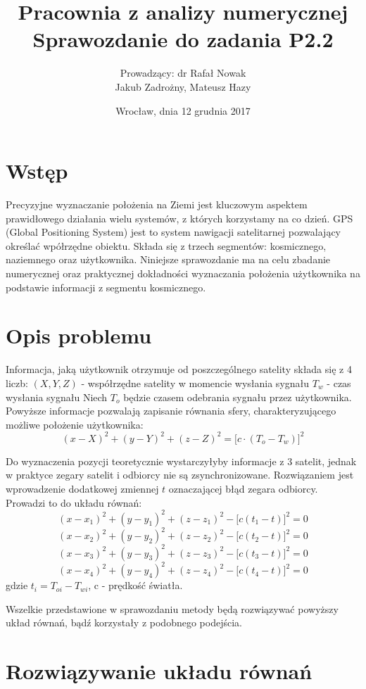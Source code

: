 \documentclass{article}
\title{\textbf{Pracownia z analizy numerycznej} \\ Sprawozdanie do zadania \textbf{P2.2}}
\author{Prowadzący: dr Rafał Nowak \\ Jakub Zadrożny, Mateusz Hazy}
\date{Wrocław, dnia 12 grudnia 2017}
\begin{document}
	\maketitle
	\section{Wstęp}
	Precyzyjne wyznaczanie położenia na Ziemi jest kluczowym aspektem prawidłowego działania wielu systemów, z których korzystamy na co dzień. GPS (Global Positioning System) jest to system nawigacji satelitarnej pozwalający określać wpółrzędne obiektu. Składa się z trzech segmentów: kosmicznego, naziemnego oraz użytkownika. Niniejsze sprawozdanie ma na celu zbadanie numerycznej oraz praktycznej dokładności wyznaczania położenia użytkownika na podstawie informacji z segmentu kosmicznego. 
	
	\section{Opis problemu}
	
	\par Informacja, jaką użytkownik otrzymuje od poszczególnego satelity składa się z 4 liczb: \newline
		\textbf{$(X, Y, Z)$} - współrzędne satelity w momencie wysłania sygnału \newline
		\textbf{$T_{w}$} - czas wysłania sygnału \newline
		Niech $T_{o}$ będzie czasem odebrania sygnału przez użytkownika.
	Powyższe informacje pozwalają zapisanie równania sfery, charakteryzującego możliwe położenie użytkownika:
	$$ (x - X)^2 + (y - Y)^2 + (z - Z)^2 = \big[c \cdot (T_{o} - T_{w})\big]^2 $$
	\par Do wyznaczenia pozycji teoretycznie wystarczyłyby informacje z 3 satelit, jednak w praktyce zegary satelit i odbiorcy nie są zsynchronizowane. Rozwiązaniem jest wprowadzenie dodatkowej zmiennej $t$ oznaczającej błąd zegara odbiorcy. Prowadzi to do układu równań:
	$$(x-x_1)^2 + (y-y_1)^2 + (z-z_1)^2 - \big[c(t_1-t)\big]^2 =0 $$
	$$(x-x_2)^2 + (y-y_2)^2 + (z-z_2)^2 - \big[c(t_2-t)\big]^2 =0$$
	$$(x-x_3)^2 + (y-y_3)^2 + (z-z_3)^2 - \big[c(t_3-t)\big]^2 =0$$
	$$(x-x_4)^2 + (y-y_4)^2 + (z-z_4)^2 - \big[c(t_4-t)\big]^2 =0$$
	gdzie $t_{i} = T_{oi} - T_{wi}$, c - prędkość światła.
	\par Wszelkie przedstawione w sprawozdaniu metody będą rozwiązywać powyższy układ równań, bądź korzystały z podobnego podejścia.
	
	\section{Rozwiązywanie układu równań}
	
\end{document}
